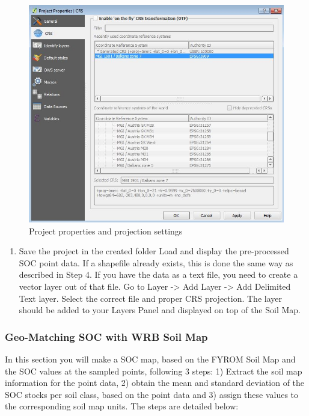 \documentclass[10pt,b5paper,]{book}
\providecommand{\tightlist}{%
  \setlength{\itemsep}{0pt}\setlength{\parskip}{0pt}}
\theoremstyle{definition}
\theoremstyle{definition}
\theoremstyle{definition}
\theoremstyle{remark}
\begin{document}
\begin{figure}

{\centering \includegraphics[width=0.8\linewidth]{images/Conv_upscaling3} 

}

\caption{Project properties and projection settings}\label{fig:qgisepsg}
\end{figure}

\begin{enumerate}
\def\labelenumi{\arabic{enumi}.}
\setcounter{enumi}{6}
\tightlist
\item
  Save the project in the created folder Load and display the
  pre-processed SOC point data. If a shapefile already exists, this is
  done the same way as described in Step 4. If you have the data as a
  text file, you need to create a vector layer out of that file. Go to
  Layer -\textgreater{} Add Layer -\textgreater{} Add Delimited Text
  layer. Select the correct file and proper CRS projection. The layer
  should be added to your Layers Panel and displayed on top of the Soil
  Map.
\end{enumerate}

\hypertarget{geo-matching-soc-with-wrb-soil-map}{%
\subsubsection{Geo-Matching SOC with WRB Soil
Map}\label{geo-matching-soc-with-wrb-soil-map}}

In this section you will make a SOC map, based on the FYROM Soil Map and
the SOC values at the sampled points, following 3 steps: 1) Extract the
soil map information for the point data, 2) obtain the mean and standard
deviation of the SOC stocks per soil class, based on the point data and
3) assign these values to the corresponding soil map units. The steps
are detailed below:
\end{document}
